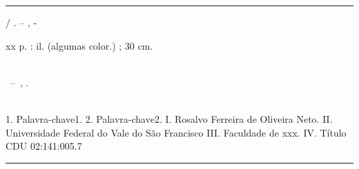 \begin{fichacatalografica}
	\vspace*{\fill}					%
	\hrule							%
	\begin{center}					%
	\begin{minipage}[c]{12.5cm}		%
    	\imprimirautor
    
    	\hspace{0.5cm} \imprimirtitulo  / \imprimirautor. --
    	\imprimirlocal, \the\year-
    
    	\hspace{0.5cm} xx p. : il. (algumas color.) ; 30 cm.\\
    
    	\hspace{0.5cm} \imprimirorientadorRotulo~\imprimirorientador\\
    
    	\hspace{0.5cm}
    	\parbox[t]{\textwidth}{\imprimirtipotrabalho~--~\imprimirinstituicao,
    	\the\year.}\\
    
    	\hspace{0.5cm}
    		1. Palavra-chave1.
    		2. Palavra-chave2.
    		I. Rosalvo Ferreira de Oliveira Neto. %
    		II. Universidade Federal do Vale do São Francisco%
    		III. Faculdade de xxx.
    		IV. Título\\
    
    	\hspace{8.75cm} CDU 02:141:005.7\\
	\end{minipage}
	\end{center}
	\hrule
\end{fichacatalografica}